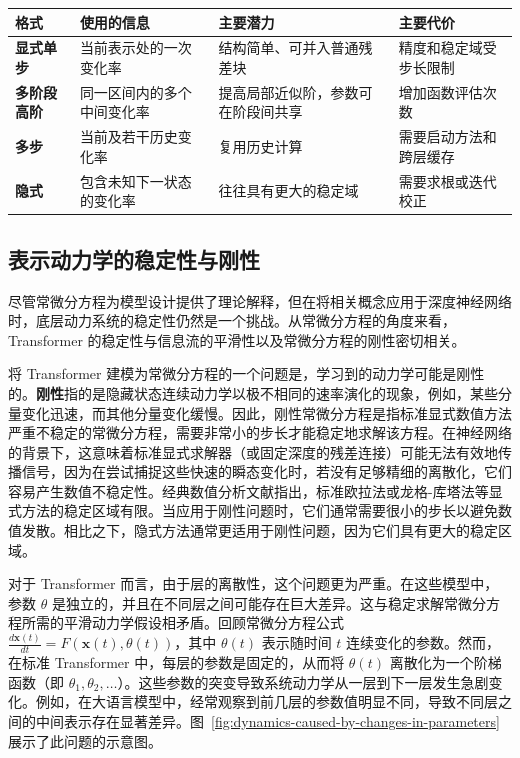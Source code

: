 \begin{center}
\begin{tabularx}{\linewidth}{>{\bfseries}lXXX}
    \toprule
    格式 & 使用的信息 & 主要潜力 & 主要代价 \\
    \midrule
    显式单步
      & 当前表示处的一次变化率
      & 结构简单、可并入普通残差块
      & 精度和稳定域受步长限制 \\
    多阶段高阶
      & 同一区间内的多个中间变化率
      & 提高局部近似阶，参数可在阶段间共享
      & 增加函数评估次数 \\
    多步
      & 当前及若干历史变化率
      & 复用历史计算
      & 需要启动方法和跨层缓存 \\
    隐式
      & 包含未知下一状态的变化率
      & 往往具有更大的稳定域
      & 需要求根或迭代校正 \\
    \bottomrule
\end{tabularx}
\end{center}


\subsection{表示动力学的稳定性与刚性}

尽管常微分方程为模型设计提供了理论解释，但在将相关概念应用于深度神经网络时，底层动力系统的稳定性仍然是一个挑战。从常微分方程的角度来看，Transformer 的稳定性与信息流的平滑性以及常微分方程的刚性密切相关。

将 Transformer 建模为常微分方程的一个问题是，学习到的动力学可能是刚性的。\textbf{刚性}指的是隐藏状态连续动力学以极不相同的速率演化的现象，例如，某些分量变化迅速，而其他分量变化缓慢。因此，刚性常微分方程是指标准显式数值方法严重不稳定的常微分方程，需要非常小的步长才能稳定地求解该方程。在神经网络的背景下，这意味着标准显式求解器（或固定深度的残差连接）可能无法有效地传播信号，因为在尝试捕捉这些快速的瞬态变化时，若没有足够精细的离散化，它们容易产生数值不稳定性。经典数值分析文献指出，标准欧拉法或龙格-库塔法等显式方法的稳定区域有限。当应用于刚性问题时，它们通常需要很小的步长以避免数值发散。相比之下，隐式方法通常更适用于刚性问题，因为它们具有更大的稳定区域。

对于 Transformer 而言，由于层的离散性，这个问题更为严重。在这些模型中，参数 $\theta$ 是独立的，并且在不同层之间可能存在巨大差异。这与稳定求解常微分方程所需的平滑动力学假设相矛盾。回顾常微分方程公式 $\frac{d\mathbf{x}(t)}{dt} = F(\mathbf{x}(t),\theta(t))$，其中 $\theta(t)$ 表示随时间 $t$ 连续变化的参数。然而，在标准 Transformer 中，每层的参数是固定的，从而将 $\theta(t)$ 离散化为一个阶梯函数（即 $\theta_1, \theta_2, \dots$）。这些参数的突变导致系统动力学从一层到下一层发生急剧变化。例如，在大语言模型中，经常观察到前几层的参数值明显不同，导致不同层之间的中间表示存在显著差异。图~\ref{fig:dynamics-caused-by-changes-in-parameters} 展示了此问题的示意图。

